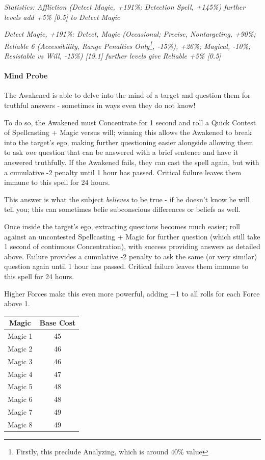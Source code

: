 \begin{multicols}{3}
	\textcolor{OliveGreen}{\textit{ Statistics: Affliction (Detect Magic, +191\%; Detection Spell, +145\%) further levels add +5\% [0.5] to Detect Magic}}
	
	\textcolor{OliveGreen}{\textit{Detect Magic, +191\%: Detect, Magic (Occasional; Precise, Nontargeting, +90\%; Reliable 6 (Accessibility, Range Penalties Only\footnote{Firstly, this preclude Analyzing, which is around 40\% value}, -15\%), +26\%; Magical, -10\%; Resistable vs Will, -15\%) [19.1] further levels give Reliable +5\% [0.5]}}
		
	\paragraph{Mind Probe}
	
	The Awakened is able to delve into the mind of a target and question them for truthful answers - sometimes in ways even they do not know!
	
	To do so, the Awakened must Concentrate for 1 second and roll a Quick Contest of Spellcasting + Magic versus will; winning this allows the Awakened to break into the target's ego, making further questioning easier alongside allowing them to ask \textit{one} question that can be answered with a brief sentence and have it answered truthfully. If the Awakened fails, they can cast the spell again, but with a cumulative -2 penalty until 1 hour has passed. Critical failure leaves them immune to this spell for 24 hours.
	
	This answer is what the subject \textit{believes} to be true - if he doesn't know he will tell you; this can sometimes belie subconscious differences or beliefs as well.
	
	Once inside the target's ego, extracting questions becomes much easier; roll against an uncontested Spellcasting + Magic for further question (which still take 1 second of continuous Concentration), with success providing answers as detailed above. Failure provides a cumulative -2 penalty to ask the same (or very similar) question again until 1 hour has passed. Critical failure leaves them immune to this spell for 24 hours.
 	
 	Higher Forces make this even more powerful, adding +1 to all rolls for each Force above 1.
 	
	\begin{center}
		\begin{tabular}{|c|c|}
			\hline
			Magic & Base Cost \\
			\hline
			\hline
			Magic 1 & 45 \\
			Magic 2 & 46 \\
			Magic 3 & 46 \\
			Magic 4 & 47 \\
			Magic 5 & 48 \\
			Magic 6 & 48 \\
			Magic 7 & 49 \\
			Magic 8 & 49 \\
			\hline
		\end{tabular}
	\end{center} 
	

\end{multicols}
